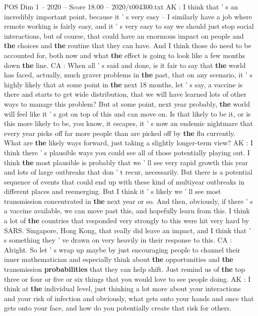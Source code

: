\begin{textsample}{POS Dim 1 – 2020 – Score 18.00 – 2020/t004300.txt}
AK : I think that ' s an incredibly important point, because it ' s very easy -- I similarly have a job where remote working is fairly easy, and it ' s very easy to say we should just stop social interactions, but of course, that could have an enormous impact on people and \textbf{the} choices and \textbf{the} routine that they can have.
And I think those do need to be accounted for, both now and what \textbf{the} effect is going to look like a few months down \textbf{the} line.
CA : When all ' s said and done, is it fair to say that \textbf{the} world has faced, actually, much graver problems in \textbf{the} past, that on any scenario, it ' s highly likely that at some point in \textbf{the} next 18 months, let ' s say, a vaccine is there and starts to get wide distribution, that we will have learned lots of other ways to manage this problem?
But at some point, next year probably, \textbf{the} world will feel like it ' s got on top of this and can move on.
Is that likely to be it, or is this more likely to be, you know, it escapes, it ' s now an endemic nightmare that every year picks off far more people than are picked off by \textbf{the} flu currently.
What are \textbf{the} likely ways forward, just taking a slightly longer-term view?
AK : I think there ' s plausible ways you could see all of those potentially playing out.
I think \textbf{the} most plausible is probably that we ' ll see very rapid growth this year and lots of large outbreaks that don ' t recur, necessarily.
But there is a potential sequence of events that could end up with these kind of multiyear outbreaks in different places and reemerging.
But I think it ' s likely we ' ll see most transmission concentrated in \textbf{the} next year or so.
And then, obviously, if there ' s a vaccine available, we can move past this, and hopefully learn from this.
I think a lot of \textbf{the} countries that responded very strongly to this were hit very hard by SARS.
Singapore, Hong Kong, that really did leave an impact, and I think that ' s something they ' ve drawn on very heavily in their response to this.
CA : Alright.
So let ' s wrap up maybe by just encouraging people to channel their inner mathematician and especially think about \textbf{the} opportunities and \textbf{the} transmission \textbf{probabilities} that they can help shift.
Just remind us of \textbf{the} top three or four or five or six things that you would love to see people doing.
AK : I think at \textbf{the} individual level, just thinking a lot more about your interactions and your risk of infection and obviously, what gets onto your hands and once that gets onto your face, and how do you potentially create that risk for others.

\end{textsample}
